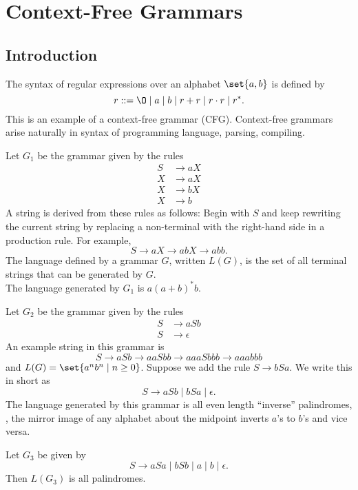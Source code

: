 \chapter{Context-Free Grammars} \label{ch:cfg}
\section{Introduction}
The syntax of regular expressions over an alphabet $\set{a, b}$ is defined
by \[
    r ::= \O \mid a \mid b \mid r + r \mid r \cdot r \mid r^*.
\] This is an example of a context-free grammar (CFG).
Context-free grammars arise naturally in syntax of programming language,
parsing, compiling.

\begin{examples}
    \item Let $G_1$ be the grammar given by the rules \begin{align*}
        S &\to aX \\
        X &\to aX \\
        X &\to bX \\
        X &\to b
    \end{align*}
    A string is derived from these rules as follows:
    Begin with $S$ and keep rewriting the current string by replacing a
    non-terminal with the right-hand side in a production rule.
    For example, \[
        S \to aX \to abX \to abb.
    \] The language defined by a grammar $G$, written $L(G)$,
    is the set of all terminal strings that can be generated by $G$. \\
    The language generated by $G_1$ is $a(a+b)^*b$.
    \item Let $G_2$ be the grammar given by the rules \begin{align*}
        S &\to aSb \\
        S &\to \epsilon
    \end{align*}
    An example string in this grammar is \[
        S \to aSb \to aaSbb \to aaaSbbb \to aaabbb
    \] and $L(G) = \set{a^nb^n \mid n \ge 0}$.
    Suppose we add the rule $S \to bSa$.
    We write this in short as \[
        S \to aSb \mid bSa \mid \epsilon.
    \] The language generated by this grammar is all even length
    ``inverse'' palindromes, \ie, the mirror image of any alphabet about the
    midpoint inverts $a$'s to $b$'s and vice versa.
    \item Let $G_3$ be given by \[
        S \to aSa \mid bSb \mid a \mid b \mid \epsilon.
    \] Then $L(G_3)$ is all palindromes.
    \item {
}
\end{examples}
